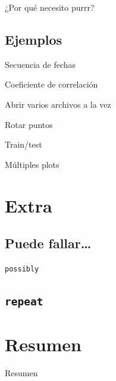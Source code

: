 \documentclass[ignorenonframetext,]{beamer}
\begin{document}
\begin{frame}{¿Por qué necesito purrr?}
\protect\hypertarget{por-quuxe9-necesito-purrr}{}
\end{frame}

\hypertarget{ejemplos}{%
\subsection{Ejemplos}\label{ejemplos}}

\begin{frame}{Secuencia de fechas}
\protect\hypertarget{secuencia-de-fechas}{}
\end{frame}

\begin{frame}{Coeficiente de correlación}
\protect\hypertarget{coeficiente-de-correlaciuxf3n}{}
\end{frame}

\begin{frame}{Abrir varios archivos a la vez}
\protect\hypertarget{abrir-varios-archivos-a-la-vez}{}
\end{frame}

\begin{frame}{Rotar puntos}
\protect\hypertarget{rotar-puntos}{}
\end{frame}

\begin{frame}{Train/test}
\protect\hypertarget{traintest}{}
\end{frame}

\begin{frame}{Múltiples plots}
\protect\hypertarget{muxfaltiples-plots}{}
\end{frame}

\hypertarget{extra}{%
\section{Extra}\label{extra}}

\hypertarget{puede-fallar}{%
\subsection{Puede fallar\ldots{}}\label{puede-fallar}}

\begin{frame}{\texttt{possibly}}
\protect\hypertarget{section-2}{}
\end{frame}

\hypertarget{section-3}{%
\subsection{\texorpdfstring{\texttt{repeat}}{}}\label{section-3}}

\hypertarget{resumen}{%
\section{Resumen}\label{resumen}}

\begin{frame}{Resumen}
\protect\hypertarget{resumen-1}{}
\end{frame}
\end{document}
